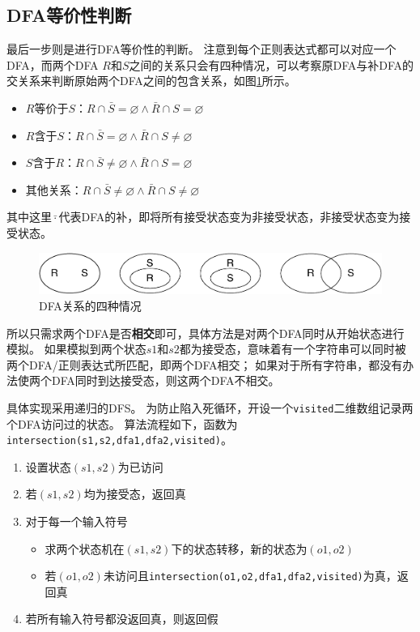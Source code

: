 \documentclass[logo,reportComp]{thesis}
\begin{document}
\subsection{DFA等价性判断}
最后一步则是进行DFA等价性的判断。
注意到每个正则表达式都可以对应一个DFA，而两个DFA $R$和$S$之间的关系只会有四种情况，可以考察原DFA与补DFA的交关系来判断原始两个DFA之间的包含关系，如图\ref{fig:dfa-test}所示。
\begin{itemize}
	\item $R$等价于$S$：$R\cap\bar{S}=\varnothing\land \bar{R}\cap S=\varnothing$
	\item $R$含于$S$：$R\cap\bar{S}=\varnothing\land \bar{R}\cap S\ne\varnothing$
	\item $S$含于$R$：$R\cap\bar{S}\ne\varnothing\land \bar{R}\cap S=\varnothing$
	\item 其他关系：$R\cap\bar{S}\ne\varnothing\land \bar{R}\cap S\ne\varnothing$
\end{itemize}
其中这里$\bar{\cdot}$代表DFA的补，即将所有接受状态变为非接受状态，非接受状态变为接受状态。

\begin{figure}[H]
\centering
\includegraphics[width=\linewidth]{fig/regex-dfa-test.pdf}
\caption{DFA关系的四种情况}
\label{fig:dfa-test}
\end{figure}

所以只需求两个DFA是否\textbf{相交}即可，具体方法是对两个DFA同时从开始状态进行模拟。
如果模拟到两个状态$s1$和$s2$都为接受态，意味着有一个字符串可以同时被两个DFA/正则表达式所匹配，即两个DFA相交；
如果对于所有字符串，都没有办法使两个DFA同时到达接受态，则这两个DFA不相交。

具体实现采用递归的DFS。
为防止陷入死循环，开设一个\verb'visited'二维数组记录两个DFA访问过的状态。
算法流程如下，函数为\verb'intersection(s1,s2,dfa1,dfa2,visited)'。
\begin{enumerate}
	\item 设置状态$(s1,s2)$为已访问
	\item 若$(s1,s2)$均为接受态，返回真
	\item 对于每一个输入符号
	\begin{itemize}
		\item 求两个状态机在$(s1,s2)$下的状态转移，新的状态为$(o1,o2)$
		\item 若$(o1,o2)$未访问且\verb'intersection(o1,o2,dfa1,dfa2,visited)'为真，返回真
	\end{itemize}
	\item 若所有输入符号都没返回真，则返回假
\end{enumerate}
\end{document}
